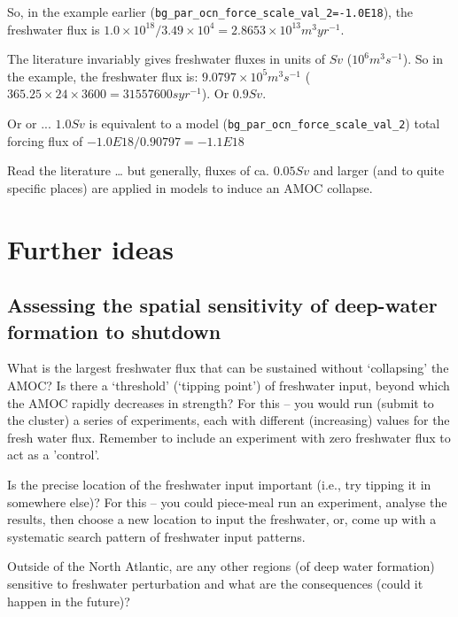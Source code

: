 So, in the example earlier (\texttt{bg\_par\_ocn\_force\_scale\_val\_2=-1.0E18}), the freshwater flux is \(1.0\times10^{18}/3.49\times10^{4} = 2.8653\times10^{13} m^{3} yr^{-1}\).

The literature invariably gives freshwater fluxes in units of \(Sv\) (\(10^{6} m^{3} s^{-1}\)). So in the example, the freshwater flux is: \(9.0797\times10^{5} m^{3} s^{-1}\) (\(365.25\times24\times3600 = 31557600 s yr^{-1}\)). Or \(0.9 Sv\).

Or or ... \(1.0 Sv\) is equivalent to a model (\texttt{bg\_par\_ocn\_force\_scale\_val\_2}) total forcing flux of \(-1.0E18/0.90797 = -1.1E18\)

Read the literature … but generally, fluxes of ca. \(0.05 Sv\) and larger (and to quite specific places) are applied in models to induce an AMOC collapse.

\newpage

\section{Further ideas}


\subsection{Assessing the spatial sensitivity of deep-water formation to shutdown}

What is the largest freshwater flux that can be sustained without ‘collapsing’ the AMOC? Is there a ‘threshold’ (‘tipping point’) of freshwater input, beyond which the AMOC rapidly decreases in strength? For this -- you would run (submit to the cluster) a series of experiments, each with different (increasing) values for the fresh water flux. Remember to include an experiment with zero freshwater flux to act as a 'control'.

Is the precise location of the freshwater input important (i.e., try tipping it in somewhere else)? For this -- you could piece-meal run an experiment, analyse the results, then choose a new location to input the freshwater, or, come up with a systematic search pattern of freshwater input patterns.  

Outside of the North Atlantic, are any other  regions (of deep water formation) sensitive to freshwater perturbation and what are the consequences (could it happen in the future)?

